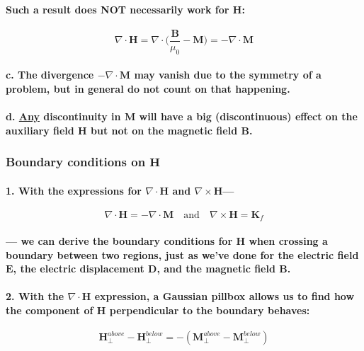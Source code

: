 \documentclass{article}
\begin{document}
\paragraph{Such a result does NOT necessarily work for $\boldsymbol{H}$:}
\begin{equation*}
    \nabla\cdot \boldsymbol{H}=\nabla\cdot\bigg( \frac{\boldsymbol{B}}{\mu_0}-\boldsymbol{M}\bigg)=-\nabla\cdot\boldsymbol{M}
\end{equation*}
\paragraph{\indent c. The divergence $-\nabla\cdot\boldsymbol{M}$ may vanish due to the symmetry of a problem, but in general do not count on that happening.}
\paragraph{\indent d. \underline{Any} discontinuity in $\boldsymbol{M}$ will have a big (discontinuous) effect on the auxiliary field $\boldsymbol{H}$ but not on the magnetic field $\boldsymbol{B}$.}
\subsubsection{Boundary conditions on $\boldsymbol{H}$}
\paragraph{1. With the expressions for $\nabla\cdot\boldsymbol{H}$ and $\nabla\times\boldsymbol{H}$---}
\begin{equation*}
   \nabla\cdot\boldsymbol{H}=-\nabla\cdot\boldsymbol{M}\quad\text{and}\quad \nabla\times \boldsymbol{H}=\boldsymbol{K}_f 
\end{equation*}
\paragraph{--- we can derive the boundary conditions for $\boldsymbol{H}$ when crossing a boundary between two regions, just as we've done for the electric field $\boldsymbol{E}$, the electric displacement $\boldsymbol{D}$, and the magnetic field $\boldsymbol{B}$.}
\paragraph{2. With the $\nabla\cdot\boldsymbol{H}$ expression, a Gaussian pillbox allows us to find how the component of $\boldsymbol{H}$ perpendicular to the boundary behaves:}
\begin{equation*}
    \boldsymbol{H}_{\perp}^{above}-\boldsymbol{H}_{\perp}^{below}=-(\boldsymbol{M}_{\perp}^{above}-\boldsymbol{M}_{\perp}^{below})
\end{equation*}
\end{document}
